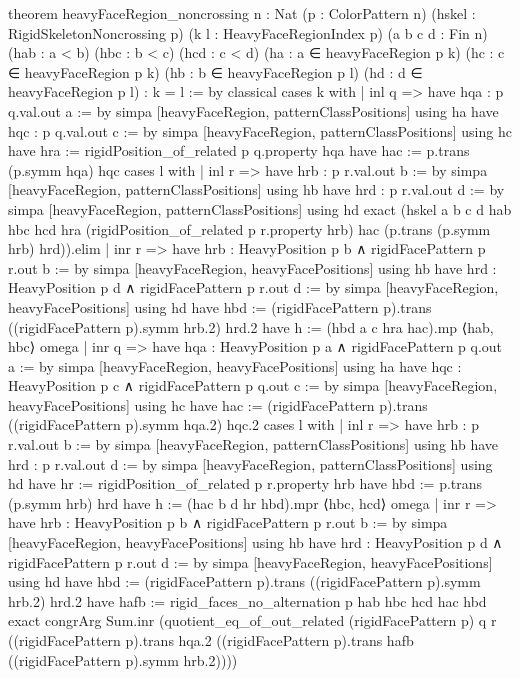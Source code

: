 \documentclass[11pt,reqno]{amsart}
\theoremstyle{definition}
\begin{document}
\begin{LeanCode}
theorem heavyFaceRegion_noncrossing {n : Nat} (p : ColorPattern n)
    (hskel : RigidSkeletonNoncrossing p)
    (k l : HeavyFaceRegionIndex p) (a b c d : Fin n)
    (hab : a < b) (hbc : b < c) (hcd : c < d)
    (ha : a ∈ heavyFaceRegion p k) (hc : c ∈ heavyFaceRegion p k)
    (hb : b ∈ heavyFaceRegion p l) (hd : d ∈ heavyFaceRegion p l) : k = l := by
  classical
  cases k with
  | inl q =>
    have hqa : p q.val.out a := by simpa [heavyFaceRegion, patternClassPositions] using ha
    have hqc : p q.val.out c := by simpa [heavyFaceRegion, patternClassPositions] using hc
    have hra := rigidPosition_of_related p q.property hqa
    have hac := p.trans (p.symm hqa) hqc
    cases l with
    | inl r =>
      have hrb : p r.val.out b := by simpa [heavyFaceRegion, patternClassPositions] using hb
      have hrd : p r.val.out d := by simpa [heavyFaceRegion, patternClassPositions] using hd
      exact (hskel a b c d hab hbc hcd hra (rigidPosition_of_related p r.property hrb)
        hac (p.trans (p.symm hrb) hrd)).elim
    | inr r =>
      have hrb : HeavyPosition p b ∧ rigidFacePattern p r.out b := by
        simpa [heavyFaceRegion, heavyFacePositions] using hb
      have hrd : HeavyPosition p d ∧ rigidFacePattern p r.out d := by
        simpa [heavyFaceRegion, heavyFacePositions] using hd
      have hbd := (rigidFacePattern p).trans ((rigidFacePattern p).symm hrb.2) hrd.2
      have h := (hbd a c hra hac).mp ⟨hab, hbc⟩
      omega
  | inr q =>
    have hqa : HeavyPosition p a ∧ rigidFacePattern p q.out a := by
      simpa [heavyFaceRegion, heavyFacePositions] using ha
    have hqc : HeavyPosition p c ∧ rigidFacePattern p q.out c := by
      simpa [heavyFaceRegion, heavyFacePositions] using hc
    have hac := (rigidFacePattern p).trans ((rigidFacePattern p).symm hqa.2) hqc.2
    cases l with
    | inl r =>
      have hrb : p r.val.out b := by simpa [heavyFaceRegion, patternClassPositions] using hb
      have hrd : p r.val.out d := by simpa [heavyFaceRegion, patternClassPositions] using hd
      have hr := rigidPosition_of_related p r.property hrb
      have hbd := p.trans (p.symm hrb) hrd
      have h := (hac b d hr hbd).mpr ⟨hbc, hcd⟩
      omega
    | inr r =>
      have hrb : HeavyPosition p b ∧ rigidFacePattern p r.out b := by
        simpa [heavyFaceRegion, heavyFacePositions] using hb
      have hrd : HeavyPosition p d ∧ rigidFacePattern p r.out d := by
        simpa [heavyFaceRegion, heavyFacePositions] using hd
      have hbd := (rigidFacePattern p).trans ((rigidFacePattern p).symm hrb.2) hrd.2
      have hafb := rigid_faces_no_alternation p hab hbc hcd hac hbd
      exact congrArg Sum.inr (quotient_eq_of_out_related (rigidFacePattern p) q r
        ((rigidFacePattern p).trans hqa.2
          ((rigidFacePattern p).trans hafb ((rigidFacePattern p).symm hrb.2))))


\end{LeanCode}
\end{document}

